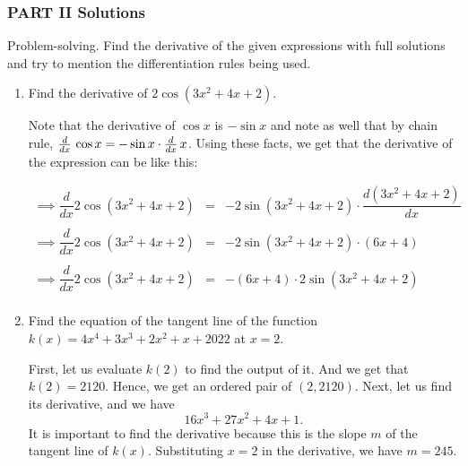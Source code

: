 \documentclass[10pt,paper=letter]{scrartcl}
\begin{document}
\subsubsection{PART II Solutions}  Problem-solving. Find the derivative of the given expressions with full solutions and try to mention the differentiation rules being used.

\begin{enumerate}[resume, label=\arabic*.,font=\bfseries]

\item Find the derivative of $2\cos (3x^2 + 4x + 2)$.


\sol 

Note that the derivative of $\cos x$ is $-\sin x$ and note as well that by chain rule, $\frac{d}{dx}\, \cos x = -\sin x \cdot \frac{d}{dx}\, x$. Using these facts, we get that the derivative of the expression can be like this:

\begin{equation*}
    \begin{array}{lll}
         \implies \dfrac{d}{dx} 2\cos (3x^2 + 4x + 2) & = &  -2\sin (3x^2 + 4x + 2) \cdot  \dfrac{d(3x^2 + 4x + 2)}{dx} \\
         
         \\
         
         \implies \dfrac{d}{dx} 2\cos (3x^2 + 4x + 2) & = &  -2\sin (3x^2 + 4x + 2) \cdot (6x +4) \\
         
         \\
         
           \implies \dfrac{d}{dx} 2\cos (3x^2 + 4x + 2) & = &  -(6x +4) \cdot 2\sin (3x^2 + 4x + 2) \\
         
    \end{array}
\end{equation*}

\item Find the equation of the tangent line of the function $k(x) = 4x^4 + 3x^3 +2x^2 + x + 2022$ at $x=2.$


\sol

First, let us evaluate $k(2)$ to find the output of it. And we get that $k(2) = 2120$. Hence, we get an ordered pair of $(2, 2120).$ Next, let us find its derivative, and we have $$16x^3 + 27x^2 + 4x + 1.$$ It is important to find the derivative because this is the slope $m$ of the tangent line of $k(x).$ Substituting $x=2$ in the derivative, we have $m=245$.


\end{enumerate}
\end{document}
